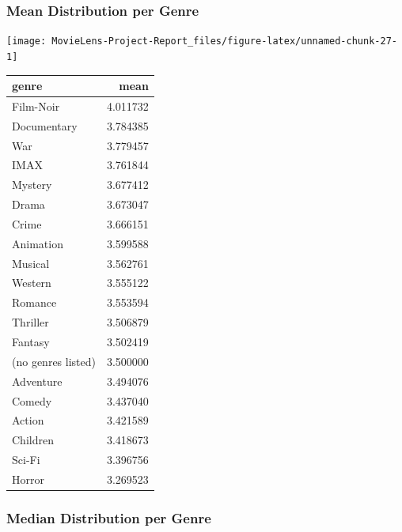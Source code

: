 \documentclass[
]{article}
\begin{document}
\hypertarget{mean-distribution-per-genre}{%
\subsubsection{Mean Distribution per
Genre}\label{mean-distribution-per-genre}}

\begin{center}\texttt{[image: MovieLens-Project-Report\_files/figure-latex/unnamed-chunk-27-1]} \end{center}

\begin{table}
\centering\begingroup\fontsize{10}{12}\selectfont

\begin{tabular}{l|r}
\hline
genre & mean\\
\hline
Film-Noir & 4.011732\\
\hline
Documentary & 3.784385\\
\hline
War & 3.779457\\
\hline
IMAX & 3.761844\\
\hline
Mystery & 3.677412\\
\hline
Drama & 3.673047\\
\hline
Crime & 3.666151\\
\hline
Animation & 3.599588\\
\hline
Musical & 3.562761\\
\hline
Western & 3.555122\\
\hline
Romance & 3.553594\\
\hline
Thriller & 3.506879\\
\hline
Fantasy & 3.502419\\
\hline
(no genres listed) & 3.500000\\
\hline
Adventure & 3.494076\\
\hline
Comedy & 3.437040\\
\hline
Action & 3.421589\\
\hline
Children & 3.418673\\
\hline
Sci-Fi & 3.396756\\
\hline
Horror & 3.269523\\
\hline
\end{tabular}
\endgroup{}
\end{table}

\hypertarget{median-distribution-per-genre}{%
\subsubsection{Median Distribution per
Genre}\label{median-distribution-per-genre}}
\end{document}
